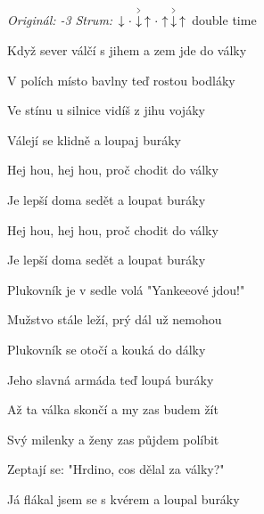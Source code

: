 \begin{song}


\begin{headerbox}
\RaiseBoxWithAccents
{} \quad
\textit{Originál: -3} \quad
\textit{Strum:} $\Down\Miss\AccentDown\Up\Miss\Up\AccentDown\Up$ double time \quad
\end{headerbox}

\begin{hchordbox}
\end{hchordbox}

\Large

\bigskip

Když sever válčí s jihem a zem jde do války \par
{}V polích místo bavlny teď rostou bodláky \par
Ve stínu u silnice vidíš z jihu vojáky \par
{}Válejí se klidně a loupaj buráky \par

\bigskip

\begin{chorusbox}{\Refren}
Hej hou, hej hou, proč chodit do války \par
Je lepší doma sedět a loupat buráky \par
Hej hou, hej hou, proč chodit do války \par
Je lepší doma sedět a loupat buráky \par
\end{chorusbox}

\bigskip

Plukovník je v sedle volá "Yankeeové jdou!" \par
{}Mužstvo stále leží, prý dál už nemohou \par
{}Plukovník se otočí a kouká do dálky \par
{}Jeho slavná armáda teď loupá buráky \par

\bigskip

\Refren

\bigskip

Až ta válka skončí a my zas budem žít \par
Svý milenky a ženy zas půjdem políbit \par
{}Zeptají se: "Hrdino, cos dělal za války?" \par
Já flákal jsem se s kvérem a loupal buráky \par

\bigskip

\Refren

\bigskip


\end{song}
